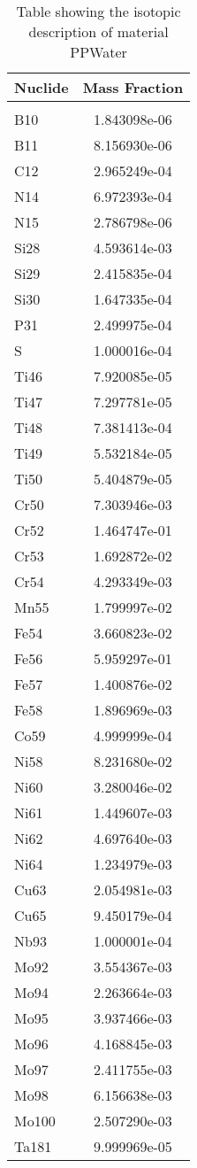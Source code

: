 \begin{centering}
\begin{table}[ht!]
\begin{tabular}{l | c}
\hline
Nuclide & Mass Fraction\\
\hline
\\
B10 & 1.843098e-06\\
B11 & 8.156930e-06\\
C12 & 2.965249e-04\\
N14 & 6.972393e-04\\
N15 & 2.786798e-06\\
Si28 & 4.593614e-03\\
Si29 & 2.415835e-04\\
Si30 & 1.647335e-04\\
P31 & 2.499975e-04\\
S & 1.000016e-04\\
Ti46 & 7.920085e-05\\
Ti47 & 7.297781e-05\\
Ti48 & 7.381413e-04\\
Ti49 & 5.532184e-05\\
Ti50 & 5.404879e-05\\
Cr50 & 7.303946e-03\\
Cr52 & 1.464747e-01\\
Cr53 & 1.692872e-02\\
Cr54 & 4.293349e-03\\
Mn55 & 1.799997e-02\\
Fe54 & 3.660823e-02\\
Fe56 & 5.959297e-01\\
Fe57 & 1.400876e-02\\
Fe58 & 1.896969e-03\\
Co59 & 4.999999e-04\\
Ni58 & 8.231680e-02\\
Ni60 & 3.280046e-02\\
Ni61 & 1.449607e-03\\
Ni62 & 4.697640e-03\\
Ni64 & 1.234979e-03\\
Cu63 & 2.054981e-03\\
Cu65 & 9.450179e-04\\
Nb93 & 1.000001e-04\\
Mo92 & 3.554367e-03\\
Mo94 & 2.263664e-03\\
Mo95 & 3.937466e-03\\
Mo96 & 4.168845e-03\\
Mo97 & 2.411755e-03\\
Mo98 & 6.156638e-03\\
Mo100 & 2.507290e-03\\
Ta181 & 9.999969e-05
\end{tabular}
\caption{Table showing the isotopic description of material PPWater}
\label{table:material_PPWater}
\end{table}\clearpage


\end{centering}
